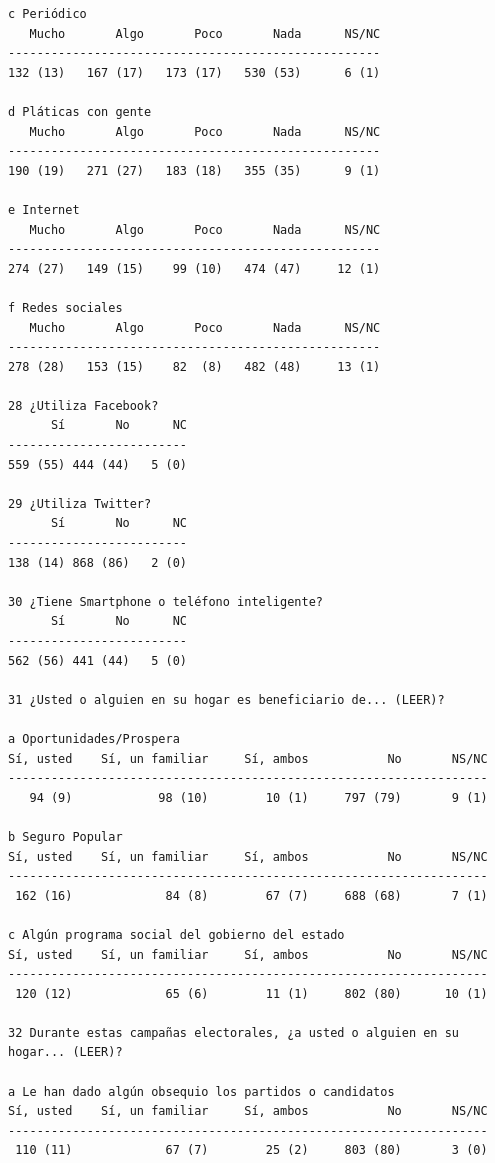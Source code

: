 \documentclass[letter,12pt]{article}
\begin{document}
\begin{scriptsize}
\begin{verbatim}
c Periódico
   Mucho       Algo       Poco       Nada      NS/NC 
----------------------------------------------------
132 (13)   167 (17)   173 (17)   530 (53)      6 (1) 

d Pláticas con gente
   Mucho       Algo       Poco       Nada      NS/NC 
----------------------------------------------------
190 (19)   271 (27)   183 (18)   355 (35)      9 (1) 

e Internet
   Mucho       Algo       Poco       Nada      NS/NC 
----------------------------------------------------
274 (27)   149 (15)    99 (10)   474 (47)     12 (1) 

f Redes sociales
   Mucho       Algo       Poco       Nada      NS/NC 
----------------------------------------------------
278 (28)   153 (15)    82  (8)   482 (48)     13 (1) 

28 ¿Utiliza Facebook?
      Sí       No      NC
-------------------------
559 (55) 444 (44)   5 (0) 

29 ¿Utiliza Twitter?
      Sí       No      NC
-------------------------
138 (14) 868 (86)   2 (0) 

30 ¿Tiene Smartphone o teléfono inteligente?
      Sí       No      NC
-------------------------
562 (56) 441 (44)   5 (0) 

31 ¿Usted o alguien en su hogar es beneficiario de... (LEER)?

a Oportunidades/Prospera
Sí, usted    Sí, un familiar     Sí, ambos           No       NS/NC
-------------------------------------------------------------------
   94 (9)            98 (10)        10 (1)     797 (79)       9 (1) 

b Seguro Popular
Sí, usted    Sí, un familiar     Sí, ambos           No       NS/NC
-------------------------------------------------------------------
 162 (16)             84 (8)        67 (7)     688 (68)       7 (1) 

c Algún programa social del gobierno del estado
Sí, usted    Sí, un familiar     Sí, ambos           No       NS/NC
-------------------------------------------------------------------
 120 (12)             65 (6)        11 (1)     802 (80)      10 (1) 

32 Durante estas campañas electorales, ¿a usted o alguien en su hogar... (LEER)?

a Le han dado algún obsequio los partidos o candidatos
Sí, usted    Sí, un familiar     Sí, ambos           No       NS/NC
-------------------------------------------------------------------
 110 (11)             67 (7)        25 (2)     803 (80)       3 (0) 


\end{verbatim}
\end{scriptsize}
\end{document}
